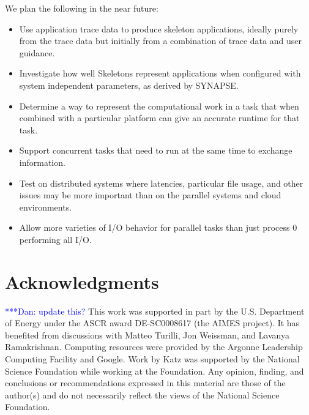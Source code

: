 \documentclass[preprint,12pt]{elsarticle}
\newcommand{\katznote}[1]{ {\textcolor{blue}    { ***Dan:   #1 }}}
\newcommand{\zhaonote}[1]{{\textcolor{darkgreen}{ ***Zhao:  #1 }}}
\newcommand{\katznote}[1]{}
\newcommand{\zhaonote}[1]{}
\begin{document}
We plan the following in the near future:
\begin{itemize}
\item {} Use application trace data to produce skeleton applications, ideally purely from the trace data but initially from a combination of trace data and user guidance.
\item {} Investigate how well Skeletons represent applications when
    configured with system independent parameters, as derived by SYNAPSE.
\item {} Determine a way to represent the computational work in a task that when combined with a particular platform can give an accurate runtime for that task.
\item {} Support concurrent tasks that need to run at the same time to exchange information.
\item {} Test on distributed systems where latencies, particular file usage, and other issues may be more important than on the parallel systems and cloud environments.
\item {} Allow more varieties of I/O behavior for parallel tasks than just process 0 performing all I/O.
\end{itemize}

\section*{Acknowledgments}

\katznote{update this?}  This work was supported in part by the U.S. Department of Energy 
under the ASCR award DE-SC0008617 (the AIMES project).
It has benefited from discussions with Matteo Turilli, Jon Weissman, and Lavanya Ramakrishnan.
Computing resources were provided by the
Argonne Leadership Computing Facility and Google. Work by Katz was supported by 
the National Science Foundation while working at the Foundation.  Any 
opinion, finding, and conclusions or recommendations expressed in this
 material are those of the author(s) and do not necessarily reflect 
 the views of the National Science Foundation.
 
\end{document}
